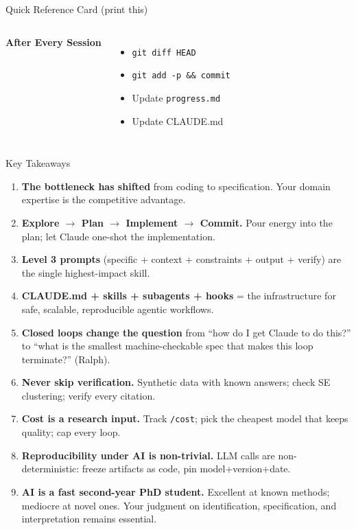 \documentclass[aspectratio=169,10pt]{beamer}
\newcommand{\emphc}[1]{\textcolor{harvardcrimson}{#1}}
\begin{document}
\begin{frame}{Quick Reference Card {\small(print this)}}
\begin{columns}[T]
\vspace{0.2em}
\textbf{\textcolor{uzhblue}{After Every Session}}
\begin{itemize}\itemsep0pt
    \item[\scriptsize$\square$] \texttt{git diff HEAD}
    \item[\scriptsize$\square$] \texttt{git add -p \&\& commit}
    \item[\scriptsize$\square$] Update \texttt{progress.md}
    \item[\scriptsize$\square$] Update CLAUDE.md
\end{itemize}
\end{columns}
\end{frame}

\begin{frame}{Key Takeaways}
\scriptsize
\begin{enumerate}\itemsep1pt
    \item \textbf{The bottleneck has shifted} from coding to \emphc{specification}. Your domain expertise is the competitive advantage.
    \item \textbf{Explore $\to$ Plan $\to$ Implement $\to$ Commit.} Pour energy into the plan; let Claude one-shot the implementation.
    \item \textbf{Level 3 prompts} (specific + context + constraints + output + verify) are the single highest-impact skill.
    \item \textbf{CLAUDE.md + skills + subagents + hooks} = the infrastructure for safe, scalable, reproducible agentic workflows.
    \item \textbf{Closed loops change the question} from ``how do I get Claude to do this?'' to ``what is the smallest machine-checkable spec that makes this loop terminate?'' (Ralph).
    \item \textbf{Never skip verification.} Synthetic data with known answers; check SE clustering; verify every citation.
    \item \textbf{Cost is a research input.} Track \texttt{/cost}; pick the cheapest model that keeps quality; cap every loop.
    \item \textbf{Reproducibility under AI is non-trivial.} LLM calls are non-deterministic: freeze artifacts as code, pin model+version+date.
    \item \textbf{AI is a fast second-year PhD student.} Excellent at known methods; mediocre at novel ones. Your judgment on identification, specification, and interpretation remains essential.
\end{enumerate}
\end{frame}
\end{document}
